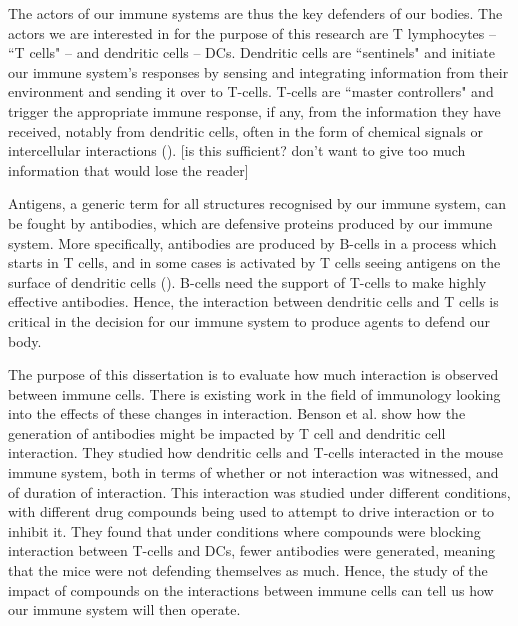 
The actors of our immune systems are thus the key defenders of our bodies. The actors we are interested in for the purpose of this research are T lymphocytes – ``T cells" – and dendritic cells – DCs. Dendritic cells are ``sentinels" and initiate our immune system's responses by sensing and integrating information from their environment and sending it over to T-cells. T-cells are ``master controllers" and trigger the appropriate immune response, if any, from the information they have received, notably from dendritic cells, often in the form of chemical signals or intercellular interactions (\cite{https://www.immunology.org/public-information/bitesized-immunology/cells/dendritic-cells, https://www.youtube.com/watch?v=hRvyCYyab68}). [is this sufficient? don't want to give too much information that would lose the reader]



Antigens, a generic term for all structures recognised by our immune system, can be fought by antibodies, which are defensive proteins produced by our immune system. More specifically, antibodies are produced by B-cells in a process which starts in T cells, and in some cases is activated by T cells seeing antigens on the surface of dendritic cells (\cite{https://elifesciences.org/articles/06994}). B-cells need the support of T-cells to make highly effective antibodies. Hence, the interaction between dendritic cells and T cells is critical in the decision for our immune system to produce agents to defend our body.

The purpose of this dissertation is to evaluate how much interaction is observed between immune cells. There is existing work in the field of immunology looking into the effects of these changes in interaction. Benson et al. show how the generation of antibodies might be impacted by T cell and dendritic cell interaction. They studied how dendritic cells and T-cells interacted in the mouse immune system, both in terms of whether or not interaction was witnessed, and of duration of interaction. This interaction was studied under different conditions, with different drug compounds being used to attempt to drive interaction or to inhibit it. They found that under conditions where compounds were blocking interaction between T-cells and DCs, fewer antibodies were generated, meaning that the mice were not defending themselves as much. Hence, the study of the impact of compounds on the interactions between immune cells can tell us how our immune system will then operate.

